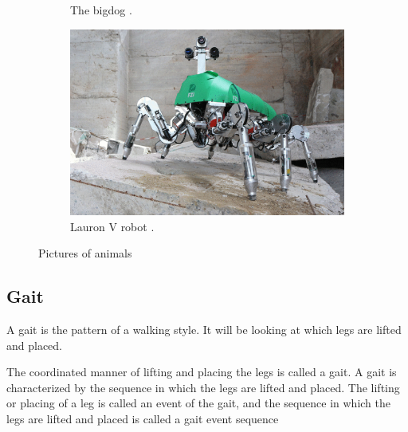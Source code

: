 \documentclass[USenglish]{ifimaster}  %
\begin{document}
\begin{figure}
\begin{subfigure}[b]{0.22\textwidth}
			\caption{The bigdog \cite{Raibert200810822}.}
			\label{fig:bigDog}
		\end{subfigure}\hfill
		\begin{subfigure}[b]{0.22\textwidth}
			\centering
			\includegraphics[width=\linewidth]{Figures/Lauron}
			\caption{Lauron V robot \cite{6878051}.}
			\label{fig:LAURON}
		\end{subfigure}
		\caption{Pictures of animals}\label{fig:robots}
	\end{figure}
	
	\FloatBarrier
	
\subsection{Gait}
A gait is the pattern of a walking style. It will be looking at which legs are lifted and placed. 

The coordinated manner of lifting and placing the legs is called a gait. A gait is characterized by the sequence in which the legs are lifted and placed. The lifting or placing of a leg is
called an event of the gait, and the sequence in which the legs are lifted and placed
is called a gait event sequence
	
\end{document}
